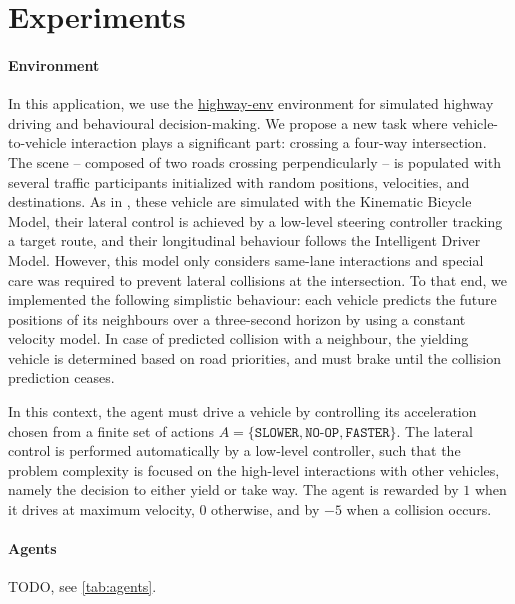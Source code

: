 \documentclass{article}
\begin{document}
{\section{Experiments}
\paragraph{Environment}

In this application, we use the \href{https://github.com/eleurent/highway-env}{highway-env} environment \citep{highway-env} for simulated highway driving and behavioural decision-making. We propose a new task where vehicle-to-vehicle interaction plays a significant part: crossing a four-way intersection.
The scene -- composed of two roads crossing perpendicularly -- is populated with several traffic participants initialized with random positions, velocities, and destinations. As in \citep{highway-env}, these vehicle are simulated with the Kinematic Bicycle Model, their lateral control is achieved by a low-level steering controller tracking a target route, and their longitudinal behaviour follows the Intelligent Driver Model. However, this model only considers same-lane interactions and special care was required to prevent lateral collisions at the intersection. To that end, we implemented the following simplistic behaviour: each vehicle predicts the future positions of its neighbours over a three-second horizon by using a constant velocity model. In case of predicted collision with a neighbour, the yielding vehicle is determined based on road priorities, and must brake until the collision prediction ceases. 

In this context, the agent must drive a vehicle by controlling its acceleration chosen from a finite set of actions $A = \{\texttt{SLOWER}, \texttt{NO-OP}, \texttt{FASTER}\}$. The lateral control is performed automatically by a low-level controller, such that the problem complexity is focused on the high-level interactions with other vehicles, namely the decision to either yield or take way. The agent is rewarded by $1$ when it drives at maximum velocity, $0$ otherwise, and by $-5$ when a collision occurs.

\paragraph{Agents}

TODO, see \autoref{tab:agents}.


}
\end{document}
